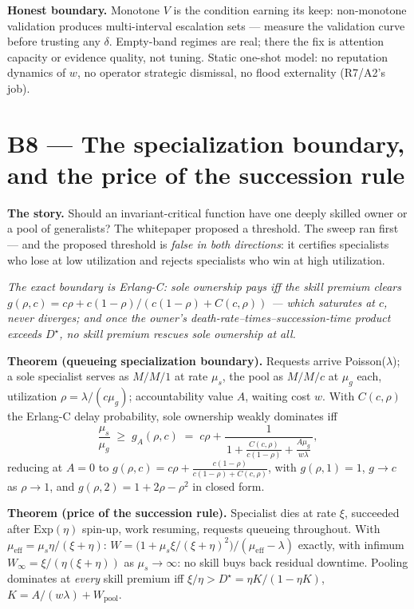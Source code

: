 \documentclass[11pt,a4paper]{article}
\newcommand{\onebreath}[1]{\begin{center}\emph{#1}\end{center}}
\begin{document}
\begin{boundary}
\textbf{Honest boundary.} Monotone $V$ is the condition earning its keep: non-monotone validation produces multi-interval escalation sets --- measure the validation curve before trusting any $\delta$. Empty-band regimes are real; there the fix is attention capacity or evidence quality, not tuning. Static one-shot model: no reputation dynamics of $w$, no operator strategic dismissal, no flood externality (R7/A2's job).
\end{boundary}

\section{B8 --- The specialization boundary, and the price of the succession rule}\label{sec:b8}
\textbf{The story.} Should an invariant-critical function have one deeply skilled owner or a pool of generalists? The whitepaper proposed a threshold. The sweep ran first --- and the proposed threshold is \emph{false in both directions}: it certifies specialists who lose at low utilization and rejects specialists who win at high utilization.

\onebreath{The exact boundary is Erlang-C: sole ownership pays iff the skill premium clears $g(\rho,c) = c\rho + c(1-\rho)/(c(1-\rho)+C(c,\rho))$ --- which saturates at $c$, never diverges; and once the owner's death-rate--times--succession-time product exceeds $D^\star$, no skill premium rescues sole ownership at all.}

\begin{thebox}
\textbf{Theorem (queueing specialization boundary).} Requests arrive Poisson($\lambda$); a sole specialist serves as $M/M/1$ at rate $\mu_s$, the pool as $M/M/c$ at $\mu_g$ each, utilization $\rho = \lambda/(c\mu_g)$; accountability value $A$, waiting cost $w$. With $C(c,\rho)$ the Erlang-C delay probability, sole ownership weakly dominates iff
\[\frac{\mu_s}{\mu_g} \;\ge\; g_A(\rho,c) \;=\; c\rho + \frac{1}{\,1 + \frac{C(c,\rho)}{c(1-\rho)} + \frac{A\mu_g}{w\lambda}\,},\]
reducing at $A=0$ to $g(\rho,c) = c\rho + \frac{c(1-\rho)}{c(1-\rho)+C(c,\rho)}$, with $g(\rho,1)=1$, $g \to c$ as $\rho \to 1$, and $g(\rho,2) = 1 + 2\rho - \rho^2$ in closed form.

\textbf{Theorem (price of the succession rule).} Specialist dies at rate $\xi$, succeeded after $\mathrm{Exp}(\eta)$ spin-up, work resuming, requests queueing throughout. With $\mu_{\mathrm{eff}} = \mu_s\eta/(\xi+\eta)$: $W = \bigl(1 + \mu_s\xi/(\xi+\eta)^2\bigr)/(\mu_{\mathrm{eff}} - \lambda)$ exactly, with infimum $W_\infty = \xi/(\eta(\xi+\eta))$ as $\mu_s \to \infty$: no skill buys back residual downtime. Pooling dominates at \emph{every} skill premium iff $\xi/\eta > D^\star = \eta K/(1-\eta K)$, $K = A/(w\lambda) + W_{\mathrm{pool}}$.
\end{thebox}
\end{document}
